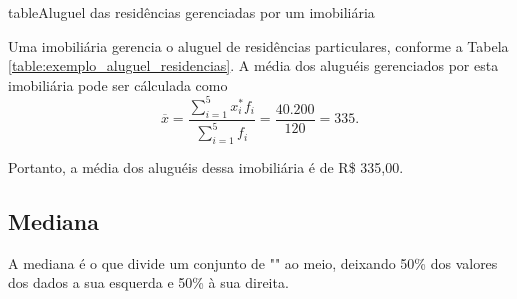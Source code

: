 \documentclass[11pt,fleqn]{book}
\numberwithin{mpicture}{chapter}
\numberwithin{mtable}{chapter}
\numberwithin{mframe}{chapter}
\begin{document}
\begin{pageWidthArea}
	\begin{pageWidthAreaPicture}{table}{Aluguel das residências gerenciadas por um imobiliária}
		\label{table:exemplo_aluguel_residencias}
		\hspace{-15pt}
	\end{pageWidthAreaPicture}
\end{pageWidthArea}

\begin{example}
	Uma imobiliária gerencia o aluguel de residências particulares, conforme a Tabela \ref{table:exemplo_aluguel_residencias}. A média dos aluguéis gerenciados por esta imobiliária pode ser cálculada como
	\[
		\overline{x}=\frac{
			\displaystyle\sum_{i=1}^{5} x_{i}^{*} f_i
		}{
			\displaystyle\sum_{i=1}^{5} f_i
		}
		= \frac{40.200}{120}
		= 335\text{.}
	\]
	
	Portanto, a média dos aluguéis dessa imobiliária é de R\$ 335,00.
\end{example}

\subsection{Mediana}

A mediana é o  que divide um conjunto de "" ao meio, deixando 50\% dos valores dos dados a sua esquerda e 50\% à sua direita.
\end{document}
